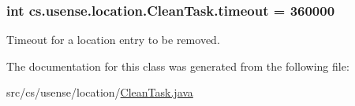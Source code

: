 \subsubsection[{timeout}]{\setlength{\rightskip}{0pt plus 5cm}int cs.\+usense.\+location.\+Clean\+Task.\+timeout = 360000\hspace{0.3cm}{\ttfamily [private]}}\label{classcs_1_1usense_1_1location_1_1_clean_task_a7ac42a9cae72c0162de562270d727dab}
Timeout for a location entry to be removed. 

The documentation for this class was generated from the following file\+:\begin{DoxyCompactItemize}
\item 
src/cs/usense/location/\hyperlink{_clean_task_8java}{Clean\+Task.\+java}\end{DoxyCompactItemize}
